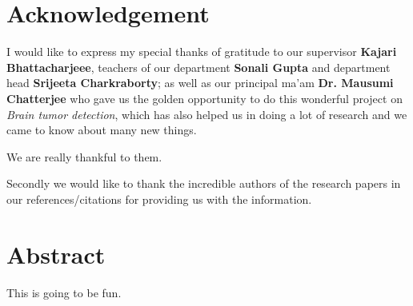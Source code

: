 \documentclass[12pt]{article}
\begin{document}
	\section[acknowledgement]{\hfill \Huge Acknowledgement \hfill}
	\label{sec:Acknowledgement}


	I would like to express my special thanks of gratitude to our supervisor
	\textbf{Kajari Bhattacharjeee}, teachers of our department \textbf{Sonali
	Gupta} and department head \textbf{Srijeeta Charkraborty}; as well as our
	principal ma'am \textbf{Dr. Mausumi Chatterjee} who gave us the golden
	opportunity to do this wonderful project on \textit{Brain tumor detection},
	which has also helped us in doing a lot of research and we came to know
	about many new things.

	We are really thankful to them.

	Secondly we would like to thank the incredible authors of the research
	papers in our references/citations for providing us with the information.

	\tableofcontents

	\section[abstract]{\hfill \Huge Abstract \hfill}

	This is going to be fun.
\end{document}
